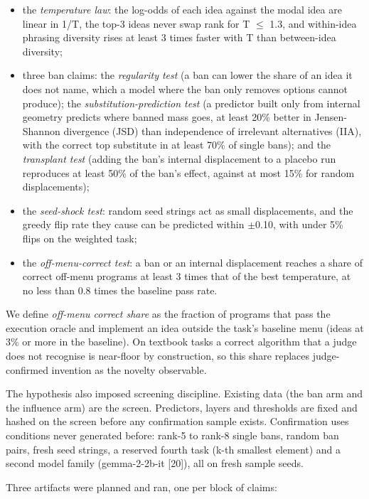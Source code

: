 \documentclass[11pt,letterpaper]{article}
\begin{document}
\begin{itemize}
\item the \emph{temperature law}: the log-odds of each idea against the modal idea are linear in 1/T, the top-3 ideas never swap rank for T \ensuremath{\leq} 1.3, and within-idea phrasing diversity rises at least 3 times faster with T than between-idea diversity;
\item three ban claims: the \emph{regularity test} (a ban can lower the share of an idea it does not name, which a model where the ban only removes options cannot produce); the \emph{substitution-prediction test} (a predictor built only from internal geometry predicts where banned mass goes, at least 20\% better in Jensen-Shannon divergence (JSD) than independence of irrelevant alternatives (IIA), with the correct top substitute in at least 70\% of single bans); and the \emph{transplant test} (adding the ban's internal displacement to a placebo run reproduces at least 50\% of the ban's effect, against at most 15\% for random displacements);
\item the \emph{seed-shock test}: random seed strings act as small displacements, and the greedy flip rate they cause can be predicted within \ensuremath{\pm}0.10, with under 5\% flips on the weighted task;
\item the \emph{off-menu-correct test}: a ban or an internal displacement reaches a share of correct off-menu programs at least 3 times that of the best temperature, at no less than 0.8 times the baseline pass rate.
\end{itemize}
We define \emph{off-menu correct share} as the fraction of programs that pass the execution oracle and implement an idea outside the task's baseline menu (ideas at 3\% or more in the baseline). On textbook tasks a correct algorithm that a judge does not recognise is near-floor by construction, so this share replaces judge-confirmed invention as the novelty observable.

The hypothesis also imposed screening discipline. Existing data (the ban arm and the influence arm) are the screen. Predictors, layers and thresholds are fixed and hashed on the screen before any confirmation sample exists. Confirmation uses conditions never generated before: rank-5 to rank-8 single bans, random ban pairs, fresh seed strings, a reserved fourth task (k-th smallest element) and a second model family (gemma-2-2b-it [20]), all on fresh sample seeds.

Three artifacts were planned and ran, one per block of claims:
\end{document}
